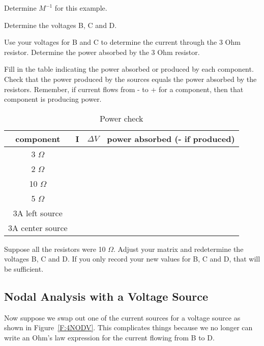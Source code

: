 \begin{blevel}
Determine $M^{-1}$ for this example.
\end{blevel}

\begin{clevel}
Determine the voltages B, C and D.
\end{clevel}

\begin{blevel}
Use your voltages for B and C to determine the current through the 3 Ohm resistor. Determine the power absorbed by the 3 Ohm resistor.
\end{blevel}

\begin{clevel}
Fill in the table indicating the power absorbed or produced by each component. Check that the power produced by the sources equals the power absorbed by the resistors. Remember, if current flows from - to + for a component, then that component is producing power.
\begin{table}[H]
\begin{center}
\begin{tabular}{|c|c|c|c|} \hline
component & I&$\Delta V$&power absorbed (- if produced) \\ \hline
3 $\Omega$ &&&	\\ \hline
2 $\Omega$&&&	\\ \hline
10 $\Omega$ &&&	\\ \hline
5 $\Omega$ &&&	\\ \hline
3A left source &&&	\\ \hline
3A center source &&&	\\ \hline
\end{tabular}
\caption{Power check}
\label{T:4PCheck}
\end{center}
\end{table}
\end{clevel}

\begin{clevel}
Suppose all the resistors were 10 $\Omega$. Adjust your matrix and redetermine the voltages B, C and D. If you only record your new values for B, C and D, that will be sufficient.
\end{clevel}

\subsection{Nodal Analysis with a Voltage Source}
Now suppose we swap out one of the current sources for a voltage source as shown in Figure~\ref{F:4NODV}. This complicates things because we no longer can write an Ohm's law expression for the current flowing from B to D.

